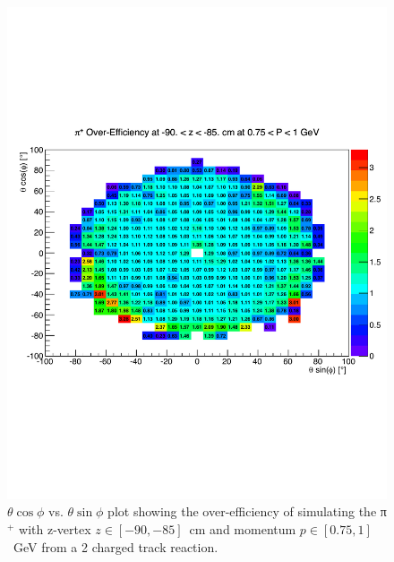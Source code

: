 \begin{figure}[htpb]\begin{center}
\includegraphics[width=1.1 \figwidth,height=\hfigheight]{figures/xsec/Pip_Eff.pdf}
\caption{\label{fig:PipEff} $\theta \cos\phi$ vs. $\theta \sin\phi$ plot showing the over-efficiency of simulating the π$^+$ with z-vertex $z \in [-90,-85]$~cm and momentum $p \in [0.75,1]$~GeV from a 2 charged track reaction.}
\end{center}\end{figure}

